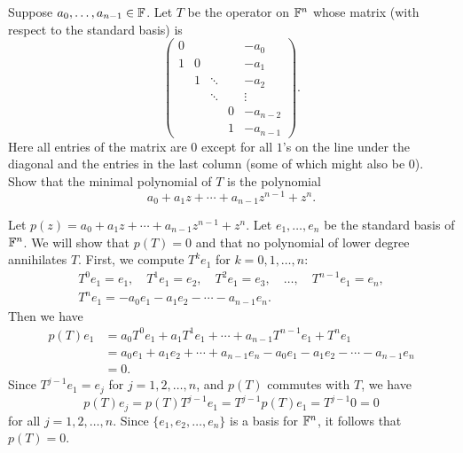 \begin{exc}
\begin{exercise}
Suppose $a_0,\dots,a_{n-1}\in\mathbb{F}$. Let $T$ be the operator on $\mathbb{F}^n$ whose
matrix (with respect to the standard basis) is
\[ \begin{pmatrix}
  0 &   &        &   & -a_0\\
  1 & 0 &        &   & -a_1\\
    & 1 & \ddots &   & -a_2\\
    &   & \ddots &   & \vdots\\
    &   &        & 0 & -a_{n-2}\\
    &   &        & 1 & -a_{n-1}
\end{pmatrix}. \]
Here all entries of the matrix are $0$ except for all $1$'s on the line under
the diagonal and the entries in the last column (some of which might also be
$0$). Show that the minimal polynomial of $T$ is the polynomial
\[ a_0+a_1z+\cdots+a_{n-1}z^{n-1}+z^n. \]
\end{exercise}
\begin{solution}
Let $p(z)=a_0+a_1z+\cdots+a_{n-1}z^{n-1}+z^n$. Let $e_1,\dots,e_n$ be the
standard basis of $\mathbb{F}^n$. We will show that $p(T)=0$ and that no polynomial of
lower degree annihilates $T$. First, we compute $T^ke_1$ for $k=0,1,\dots,n$:
\begin{gather*}
T^0e_1=e_1,\quad T^1e_1=e_2,\quad T^2e_1=e_3,\quad\dots,\quad
T^{n-1}e_1=e_n,\\
T^ne_1=-a_0e_1-a_1e_2-\cdots-a_{n-1}e_n.
\end{gather*}
Then we have
\begin{align*}
p(T)e_1 &= a_0T^0e_1+a_1T^1e_1+\cdots+a_{n-1}T^{n-1}e_1+T^ne_1\\
        &= a_0e_1+a_1e_2+\cdots+a_{n-1}e_n-a_0e_1-a_1e_2-\cdots-a_{n-1}e_n\\
        &= 0.
\end{align*}
Since $T^{j-1}e_1=e_j$ for $j=1,2,\dots,n$, and $p(T)$ commutes with $T$, we
have
\[ p(T)e_j=p(T)T^{j-1}e_1=T^{j-1}p(T)e_1=T^{j-1}0=0 \]
for all $j=1,2,\dots,n$. Since $\{e_1,e_2,\dots,e_n\}$ is a basis for $\mathbb{F}^n$,
it follows that $p(T)=0$.


\end{solution}
\end{exc}
